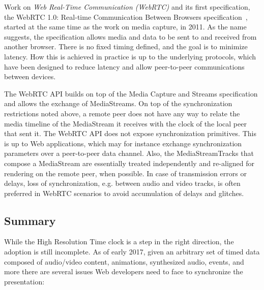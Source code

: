 \documentclass[graybox]{svmult}
\begin{document}
Work on \emph{Web Real-Time Communication (WebRTC)} and its first specification, 
the WebRTC 1.0: Real-time Communication Between Browsers
specification~\cite{webrtc}, started at the same time as the work on media
capture, in 2011. As the name suggests, the specification allows media and
data to be sent to and received from another browser. There is no fixed timing
defined, and the goal is to minimize latency. How this is achieved in practice
is up to the underlying protocols, which have been designed to reduce latency
and allow peer-to-peer communications between devices.

The WebRTC API builds on top of the Media Capture and Streams specification
and allows the exchange of MediaStreams. On top of the synchronization
restrictions noted above, a remote peer does not have any way to relate the
media timeline of the MediaStream it receives with the clock of the local
peer that sent it. The \mbox{WebRTC} API does not expose synchronization primitives.
This is up to Web applications, which may for instance exchange
synchronization parameters over a peer-to-peer data channel. Also, the
MediaStreamTracks that compose a MediaStream are essentially treated
independently and re-aligned for rendering on the remote peer, when possible.
In case of transmission errors or delays, loss of synchronization, e.g.
between audio and video tracks, is often preferred in WebRTC scenarios to
avoid accumulation of delays and glitches.

\subsection{Summary}

While the High Resolution Time clock is a step in the right direction, the
adoption is still incomplete. As of early 2017, given an arbitrary set of
timed data composed of audio/video content, animations, synthesized audio,
events, and more there are several issues Web developers need to face to
synchronize the presentation:
\end{document}
